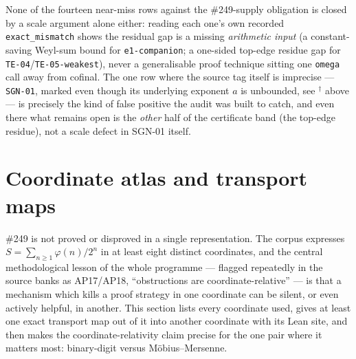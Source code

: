 None of the fourteen near-miss rows against the \#249-supply obligation is closed by a scale
argument alone either: reading each one's own recorded \texttt{exact\_mismatch} shows the residual
gap is a missing \emph{arithmetic input} (a constant-saving Weyl-sum bound for
\texttt{e1-companion}; a one-sided top-edge residue gap for \texttt{TE-04}/\texttt{TE-05-weakest}), never a
generalisable proof technique sitting one \texttt{omega} call away from cofinal. The one row where
the source tag itself is imprecise — \texttt{SGN-01}, marked  even though its
underlying exponent $a$ is unbounded, see $^\dagger$ above — is precisely the kind of false
positive the audit was built to catch, and even there what remains open is the \emph{other} half of
the certificate band (the top-edge residue), not a scale defect in SGN-01 itself.

\section{Coordinate atlas and transport maps}

\#249 is not proved or disproved in a single representation. The corpus expresses
$S=\sum_{n\ge1}\varphi(n)/2^n$ in at least eight distinct coordinates, and the central
methodological lesson of the whole programme — flagged repeatedly in the source banks as
AP17/AP18, ``obstructions are coordinate-relative'' — is that a mechanism which kills a proof
strategy in one coordinate can be silent, or even actively helpful, in another. This section lists
every coordinate used, gives at least one exact transport map out of it into another coordinate
with its Lean site, and then makes the coordinate-relativity claim precise for the one pair where
it matters most: binary-digit versus M\"obius--Mersenne.

